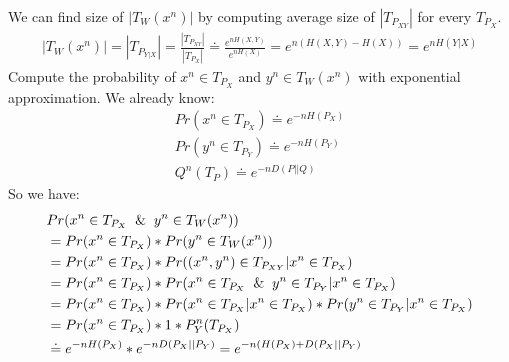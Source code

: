 \documentclass[
  course = {{EE623 Information Theory}},
  quartile = {{Fall 2020}},
  assignment = 10,
  name = {{Mohammad Mahdi Rahimi}},
  studentnumber = {{20208244}},
  email = {{mahi@kaist.ac.kr}},
  firstexercise = 1
]{aga-homework}
\begin{document}
We can find size of $|T_W(x^n)|$ by computing average size of $|T_{P_{XY}}|$ for every $T_{P_X}$.
\begin{equation} \label{eq3}
\begin{split}
|T_W(x^n)| = |T_{P_{Y|X}}| = \frac{|T_{P_{XY}}|}{|T_{P_{X}}|} \doteq \frac{e^{nH(X,Y)}}{e^{nH(X)}} = e^{n(H(X,Y) - H(X))} = e^{nH(Y|X)}
\end{split}
\end{equation}
\subexercise Compute the probability of $x^n \in T_{P_{X}}$ and $y^n \in T_W(x^n)$ with exponential approximation.
We already know:
\begin{equation} \label{eq4}
\begin{split}
Pr(x^n \in T_{P_X}) \doteq e^{-nH(P_X)}\\
Pr(y^n \in T_{P_Y}) \doteq e^{-nH(P_Y)}\\
Q^n(T_P) \doteq e^{-nD(P||Q)}
\end{split}
\end{equation}
So we have:
\begin{equation} \label{eq5}
\begin{split}
& Pr(x^n \in T_{P_{X}} \And y^n \in T_W(x^n)) \\
& = Pr(x^n \in T_{P_X}) * Pr(y^n \in T_W(x^n)) \\
& = Pr(x^n \in T_{P_X}) * Pr((x^n, y^n) \in T_{P_{XY}} | x^n \in T_{P_X})\\
& = Pr(x^n \in T_{P_X}) * Pr(x^n \in T_{P_X} \And y^n \in T_{P_Y} | x^n \in T_{P_X})\\
& = Pr(x^n \in T_{P_X}) * Pr(x^n \in T_{P_X} | x^n \in T_{P_X}) * Pr(y^n \in T_{P_Y} | x^n \in T_{P_X})\\
& = Pr(x^n \in T_{P_X}) * 1 * P^n_Y(T_{P_X})\\
& \doteq e^{-nH(P_X)} * e^{-nD(P_X||P_Y)} = e^{-n(H(P_X) + D(P_X||P_Y)}
\end{split}
\end{equation}
\end{document}

